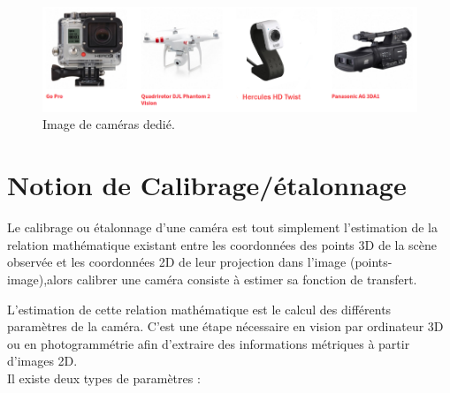 \begin{itemize}
			\begin{figure}[h]
				\centering
				\includegraphics[scale=0.65]{image/caméras dedié.png}
				\decoRule
				\caption[Caméras dedié]{Image de caméras dedié.}
				\label{fig:Caméras dedié}
			\end{figure}
				
\end{itemize}


\newpage
\section{Notion de  Calibrage/étalonnage}

Le calibrage ou étalonnage d'une caméra est tout simplement l’estimation de la relation mathématique existant entre les coordonnées des points 3D de la scène observée et les coordonnées 2D de leur projection dans l'image (points-image),alors calibrer une caméra consiste à estimer sa fonction de transfert.

L'estimation de cette relation mathématique est le calcul des différents paramètres de la caméra. C'est une étape nécessaire en vision par ordinateur 3D ou en photogrammétrie afin d'extraire des informations métriques à partir d'images 2D.\\

Il existe deux types de paramètres :\\

